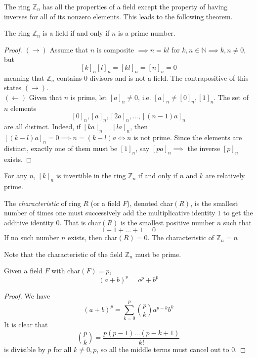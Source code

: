 \documentclass{article}
\begin{document}
    The ring $\mathbb{Z}_n$ has all the properties of a field except the property of having inverses for all of its nonzero elements. This leads to the following theorem. 

    \begin{theorem}
      The ring $\mathbb{Z}_{n}$ is a field if and only if $n$ is a prime number. 
    \end{theorem}
    \begin{proof}
      $(\rightarrow)$ Assume that $n$ is composite $\implies n = k l$ for $k, n \in \mathbb{N} \implies k, n \neq 0$, but 
      \[ [k]_n [l]_n = [k l]_n = [n]_n = 0\]
      meaning that $\mathbb{Z}_n$ contains $0$ divisors and is not a field. The contrapositive of this states $(\rightarrow)$. \\
      $(\leftarrow)$ Given that $n$ is prime, let $[a]_n \neq 0$, i.e. $[a]_n \neq [0]_n, [1]_n$. The set of $n$ elements 
      \[[0]_n, [a]_n, [2a]_n, ..., [(n-1)a]_n\]
      are all distinct. Indeed, if $[k a]_n = [l a]_n$, then $[(k-l) a]_n = 0 \implies n = (k-l) a \iff n$ is not prime. Since the elements are distinct, exactly one of them must be $[1]_n$, say $[p a]_n \implies$ the inverse $[p]_n$ exists. 
    \end{proof}

    \begin{corollary}
      For any $n$, $[k]_n$ is invertible in the ring $\mathbb{Z}_n$ if and only if $n$ and $k$ are relatively prime. 
    \end{corollary}

    \begin{definition}
      The \textit{characteristic} of ring $R$ (or a field $F$), denoted char$(R)$, is the smallest number of times one must successively add the multiplicative identity $1$ to get the additive identity $0$. That is char$(R)$ is the smallest positive number $n$ such that 
      \[ 1 + 1 + ... + 1 = 0 \]
      If no such number $n$ exists, then char$(R) = 0$. The characteristic of $\mathbb{Z}_n = n$
    \end{definition}

    Note that the characteristic of the field $\mathbb{Z}_n$ must be prime. 

    \begin{theorem}
      Given a field $F$ with char$(F) = p$, 
      \[(a + b)^p = a^p + b^p\]
    \end{theorem}
    \begin{proof}
      We have 
      \[(a + b)^p = \sum_{k = 0}^p \binom{p}{k} a^{p-k} b^{k}\]
      It is clear that 
      \[\binom{p}{k} = \frac{p (p-1) ... (p - k+1)}{k!}\]
      is divisible by $p$ for all $k \neq 0, p$, so all the middle terms must cancel out to $0$. 
    \end{proof}
\end{document}
